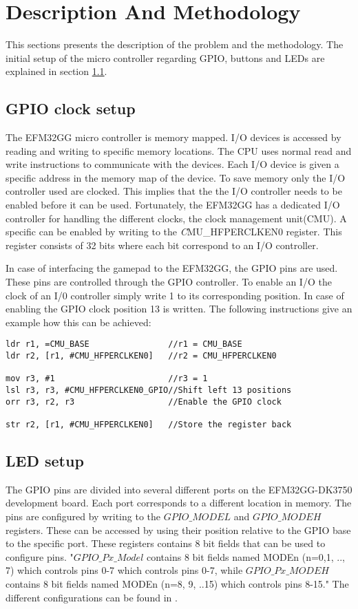 \section{Description And Methodology}
This sections presents the description of the problem and the methodology. The initial setup of the micro controller regarding GPIO, buttons and LEDs are explained in section \ref{ch:initial_setup}. 


\subsection{GPIO clock setup} \label{ch:initial_setup}
The EFM32GG micro controller is memory mapped. I/O devices is accessed by reading and writing to specific memory locations. The CPU uses normal read and write instructions to communicate with the devices. Each I/O device is given a specific address in the memory map of the device. To save memory only the I/O controller used are clocked. This implies that the the I/O controller needs to be enabled before it can be used. Fortunately, the EFM32GG has a dedicated I/O controller for handling the different clocks, the clock management unit(CMU). A specific can be enabled by writing to the \emph CMU\_HFPERCLKEN0 register. This register consists of 32 bits where each bit correspond to an I/O controller. 

In case of interfacing the gamepad to the EFM32GG, the GPIO pins are used. These pins are controlled through the GPIO controller. To enable an I/O the clock of an I/0 controller simply write 1 to its corresponding position. In case of enabling the GPIO clock position 13 is written. The following instructions give an example how this can be achieved: 

\begin{lstlisting}
ldr r1, =CMU_BASE                //r1 = CMU_BASE
ldr r2, [r1, #CMU_HFPERCLKEN0]   //r2 = CMU_HFPERCLKEN0 

mov r3, #1                       //r3 = 1
lsl r3, r3, #CMU_HFPERCLKEN0_GPIO//Shift left 13 positions
orr r3, r2, r3                   //Enable the GPIO clock

str r2, [r1, #CMU_HFPERCLKEN0]   //Store the register back 
\end{lstlisting}


\subsection{LED setup}

The GPIO pins are divided into several different ports on the EFM32GG-DK3750 development board. Each port corresponds to a different location in memory.  The pins are configured by writing to the $GPIO\_MODEL$ and $GPIO\_MODEH$ registers. These can be accessed by using their position relative to the GPIO base to the specific port. These registers contains 8 bit fields that can be used to configure pins.  "$GPIO\_Px\_Model$ contains 8 bit fields named MODEn (n=0,1, .., 7) which controls pins 0-7 which controls pins 0-7, while $GPIO\_Px\_MODEH$ contains 8 bit fields named MODEn (n=8, 9, ..15) which controls pins 8-15." The different configurations can be found in \cite[p.758-759]{EFM32GG-rm}.    

